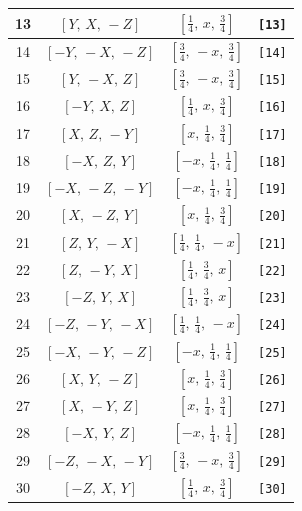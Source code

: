 \documentclass[fleqn,8pt]{jsarticle}
\begin{document}
\begin{longtable}{cccc}
13 & $\left[ Y,\, X,\, - Z \right]$ & $\left[ \frac{1}{4},\, x,\, \frac{3}{4} \right]$ & {\tt [13]} \\ \hline
14 & $\left[ - Y,\, - X,\, - Z \right]$ & $\left[ \frac{3}{4},\, - x,\, \frac{3}{4} \right]$ & {\tt [14]} \\ \hline
15 & $\left[ Y,\, - X,\, Z \right]$ & $\left[ \frac{3}{4},\, - x,\, \frac{3}{4} \right]$ & {\tt [15]} \\ \hline
16 & $\left[ - Y,\, X,\, Z \right]$ & $\left[ \frac{1}{4},\, x,\, \frac{3}{4} \right]$ & {\tt [16]} \\ \hline
17 & $\left[ X,\, Z,\, - Y \right]$ & $\left[ x,\, \frac{1}{4},\, \frac{3}{4} \right]$ & {\tt [17]} \\ \hline
18 & $\left[ - X,\, Z,\, Y \right]$ & $\left[ - x,\, \frac{1}{4},\, \frac{1}{4} \right]$ & {\tt [18]} \\ \hline
19 & $\left[ - X,\, - Z,\, - Y \right]$ & $\left[ - x,\, \frac{1}{4},\, \frac{1}{4} \right]$ & {\tt [19]} \\ \hline
20 & $\left[ X,\, - Z,\, Y \right]$ & $\left[ x,\, \frac{1}{4},\, \frac{3}{4} \right]$ & {\tt [20]} \\ \hline
21 & $\left[ Z,\, Y,\, - X \right]$ & $\left[ \frac{1}{4},\, \frac{1}{4},\, - x \right]$ & {\tt [21]} \\ \hline
22 & $\left[ Z,\, - Y,\, X \right]$ & $\left[ \frac{1}{4},\, \frac{3}{4},\, x \right]$ & {\tt [22]} \\ \hline
23 & $\left[ - Z,\, Y,\, X \right]$ & $\left[ \frac{1}{4},\, \frac{3}{4},\, x \right]$ & {\tt [23]} \\ \hline
24 & $\left[ - Z,\, - Y,\, - X \right]$ & $\left[ \frac{1}{4},\, \frac{1}{4},\, - x \right]$ & {\tt [24]} \\ \hline
25 & $\left[ - X,\, - Y,\, - Z \right]$ & $\left[ - x,\, \frac{1}{4},\, \frac{1}{4} \right]$ & {\tt [25]} \\ \hline
26 & $\left[ X,\, Y,\, - Z \right]$ & $\left[ x,\, \frac{1}{4},\, \frac{3}{4} \right]$ & {\tt [26]} \\ \hline
27 & $\left[ X,\, - Y,\, Z \right]$ & $\left[ x,\, \frac{1}{4},\, \frac{3}{4} \right]$ & {\tt [27]} \\ \hline
28 & $\left[ - X,\, Y,\, Z \right]$ & $\left[ - x,\, \frac{1}{4},\, \frac{1}{4} \right]$ & {\tt [28]} \\ \hline
29 & $\left[ - Z,\, - X,\, - Y \right]$ & $\left[ \frac{3}{4},\, - x,\, \frac{3}{4} \right]$ & {\tt [29]} \\ \hline
30 & $\left[ - Z,\, X,\, Y \right]$ & $\left[ \frac{1}{4},\, x,\, \frac{3}{4} \right]$ & {\tt [30]} \\ \hline

\end{longtable}
\end{document}
